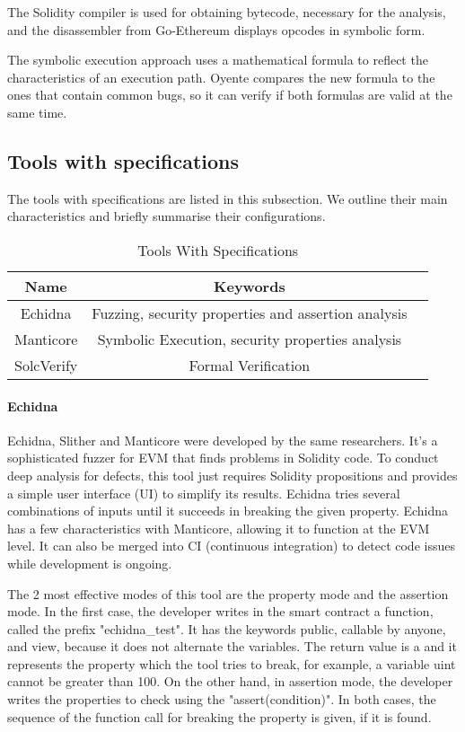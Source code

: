 \documentclass[a4paper,sigconf, language=french,
language=german, language=spanish, language=english]{acmart}
\begin{document}
The Solidity compiler is used for obtaining bytecode, necessary for the analysis, and the disassembler from
Go-Ethereum displays opcodes in symbolic form.

The symbolic execution approach uses a mathematical formula to reflect the characteristics of an execution path.
Oyente compares the new formula to the ones that contain common bugs, so it can verify if both formulas are valid at the same time. 

\subsection{Tools with specifications}

The tools with specifications are listed in this subsection. We outline their main characteristics and briefly summarise their configurations.

\begin{table*}
  \caption{Tools With Specifications}
  \label{tab:ToolsWithSpec}
  \begin{tabular}{ccl}
    \toprule
    Name & Keywords \\
    \midrule
    Echidna  & Fuzzing, security properties and assertion analysis\\
    Manticore  & Symbolic Execution, security properties analysis \\
    SolcVerify & Formal Verification \\
    \hline
  \end{tabular}
\end{table*}


\paragraph{Echidna} 
Echidna, Slither and Manticore were developed by the same researchers.
It's a sophisticated fuzzer for EVM that finds problems in Solidity code.
To conduct deep analysis for defects, this tool just requires Solidity propositions and provides a simple user interface (UI) to simplify its results.
Echidna tries several combinations of inputs until it succeeds in breaking the given property.
Echidna has a few characteristics with Manticore, allowing it to function at the EVM level.
It can also be merged into CI (continuous integration) to detect code issues while development is ongoing. 

The 2 most effective modes of this tool are the property mode and the assertion mode. In the first case, the developer writes in the smart contract a function, called the prefix "echidna\_test". It has the keywords public, callable by anyone, and view, because it does not alternate the variables. The return value is a  and it represents the property which the tool tries to break, for example, a variable uint cannot be greater than 100. On the other hand, in assertion mode, the developer writes the properties to check using the "assert(condition)". In both cases, the sequence of the function call for breaking the property is given, if it is found.
\end{document}
